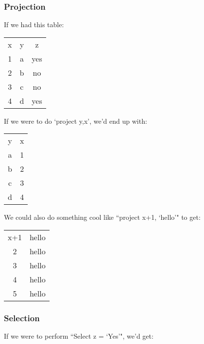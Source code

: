 \documentclass[11pt,a4paper,titlepage,dvipsnames,cmyk]{scrartcl}
\begin{document}
\begin{minipage}{\textwidth}
\subsubsection{Projection}%
\label{ssub:projection}
If we had this table:

\begin{center}
    \begin{tabular}{c|c|c}
        x & y & z \\
        \hhline{=|=|=}
        1 & a & yes \\
        2 & b & no \\
        3 & c & no \\
        4 & d & yes
    \end{tabular}
\end{center}
\end{minipage}
If we were to do `project y,x', we'd end up with:

\begin{center}
    \begin{tabular}{c|c}
        y & x \\ \hhline{=|=}
        a & 1 \\
        b & 2 \\
        c & 3 \\
        d & 4
    \end{tabular}
\end{center}

We could also do something cool like ``project x+1, `hello'" to get:

\begin{center}
    \begin{tabular}{c|c}
        x+1 & hello \\ \hhline{=|=}
        2 & hello \\
        3 & hello \\
        4 & hello \\
        5 & hello \\
    \end{tabular}
\end{center}
\newpage

\subsubsection{Selection}%
\label{ssub:selection}
If we were to perform ``Select z = `Yes'", we'd get:
\end{document}
